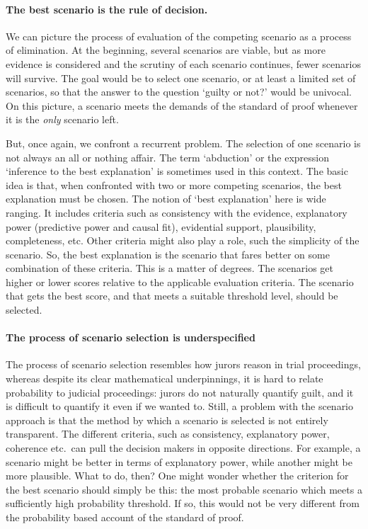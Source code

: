 \documentclass[10pt]{article}
\begin{document}
\paragraph{The best scenario is the rule of decision.}

We can picture the process of evaluation of the competing scenario as a process of elimination. 
At the beginning, several scenarios are viable, but as more evidence is considered and the scrutiny of each scenario continues,
fewer scenarios will survive. The goal would be to select one scenario, or at least a limited set of scenarios, so that 
the answer to the question `guilty or not?' would be univocal. On this picture, a scenario meets the demands of the standard 
of proof whenever it is the \textit{only} scenario left.

But, once again, we confront a recurrent problem. The selection of one scenario is not always an all or nothing affair.
The term `abduction' or the expression `inference to the best explanation' is sometimes used in this context. The basic idea is that, when confronted 
with two or more competing scenarios, the best explanation must be chosen. The notion of `best explanation' here is wide ranging. It includes criteria such as 
consistency with the evidence, explanatory power (predictive power and causal fit), evidential support, plausibility, completeness, etc. 
Other criteria might also play a role, such the simplicity of the scenario.  So, the best explanation is the scenario that fares 
better on some combination of these criteria. This is a matter of degrees. The scenarios get higher 
or lower scores relative to the applicable evaluation criteria. The scenario that gets the best score, and that 
meets a suitable threshold level, should be selected. 





\paragraph{The process of scenario selection is underspecified}

The process of scenario selection resembles how jurors reason in trial proceedings, whereas despite its 
clear mathematical underpinnings, it is hard to relate probability to judicial proceedings: jurors do not 
naturally quantify guilt, and it is difficult to quantify it even if we wanted to. Still, a problem with the scenario approach is that 
the method by which a scenario is selected is not entirely transparent. The different criteria, such as consistency, explanatory power, coherence etc.\ 
can pull the decision makers in opposite directions. For example, a scenario might be better in terms of explanatory power, while another might 
be more plausible. What to do, then? One might wonder whether the criterion for the best scenario should simply be this:
the most probable scenario which meets a sufficiently high probability threshold. If so, this would not be very 
different from the probability based account of the standard of proof. 
\end{document}
